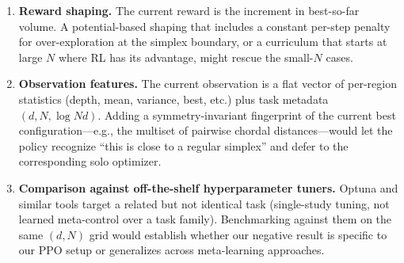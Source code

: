 \documentclass[11pt]{article}
\begin{document}
\begin{enumerate}
\item \textbf{Reward shaping.} The current reward is the increment
      in best-so-far volume.  A potential-based shaping that
      includes a constant per-step penalty for over-exploration at
      the simplex boundary, or a curriculum that starts at large
      $N$ where RL has its advantage, might rescue the small-$N$
      cases.

\item \textbf{Observation features.} The current observation is
      a flat vector of per-region statistics (depth, mean, variance,
      best, etc.) plus task metadata $(d, N, \log Nd)$.  Adding a
      symmetry-invariant fingerprint of the current best
      configuration---e.g., the multiset of pairwise chordal
      distances---would let the policy recognize ``this is close
      to a regular simplex'' and defer to the corresponding solo
      optimizer.

\item \textbf{Comparison against off-the-shelf hyperparameter
      tuners.} Optuna and similar tools target a related but not
      identical task (single-study tuning, not learned meta-control
      over a task family).  Benchmarking against them on the same
      $(d, N)$ grid would establish whether our negative result is
      specific to our PPO setup or generalizes across meta-learning
      approaches.
\end{enumerate}
\end{document}
